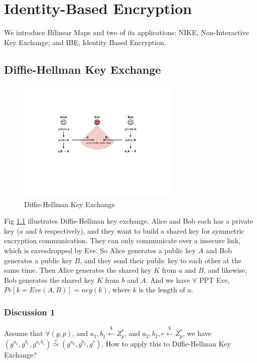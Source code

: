 \chapter{Identity-Based Encryption}

We introduce Bilinear Maps and two of its applications: NIKE, Non-Interactive Key Exchange; and IBE, Identity Based Encryption.


\section{Diffie-Hellman Key Exchange}

\begin{figure}
\label{fig:dh}
\centering
  \includegraphics[width=0.7\textwidth]{Old Scribe Notes/fig1.pdf}
\caption{Diffie-Hellman Key Exchange}
\end{figure}


Fig \ref{fig:dh} illustrates Diffie-Hellman key exchange. Alice and Bob each has a private key ($a$ and $b$ respectively), and they want to build a shared key for symmetric encryption communication. They can only communicate over a insecure link, which is eavesdropped by Eve.
So Alice generates a public key $A$ and Bob generates a public key $B$, and they send their public key to each other at the same time. Then Alice generates the shared key $K$ from $a$ and $B$, and likewise, Bob generates the shared key $K$ from $b$ and $A$.
And we have $\forall$ PPT Eve, $Pr[k=Eve(A,B)]=neg(k)$, where $k$ is the length of $a$.


\subsection{Discussion 1}

Assume that $\forall (g, p)$, and $a_1,b_1 \stackrel{\$}{\gets} Z^*_p$, and $a_2,b_2,r \stackrel{\$}{\gets}Z^*_p$, we have $(g^{a_1}, g^{b_1}, g^{a_1b_1}) \stackrel{c}{\simeq} (g^{a_2}, g^{b_2}, g^r)$. How to apply this to Diffie-Hellman Key Exchange?


